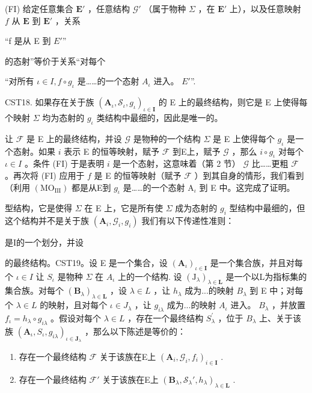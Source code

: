 (FI) 给定任意集合 \(\mathbf{E}'\) ，任意结构 \(\mathcal{G}'\) （属于物种 \(\Sigma\) ，在 \(\mathbf{E}'\) 上），以及任意映射 \(f\) 从 \(\mathbf{E}\) 到 \(\mathbf{E}'\) ，关系

“f 是从 E 到 \(E'\)''

的态射”等价于关系“对每个

``对所有 \(\iota\in I,f\circ g_{\iota}\) 是……的一个态射 \(A_{\iota}\) 进入。 \(E'\)''.

CST18. 如果存在关于族 \((\mathbf{A}_{\iota}, \mathcal{S}_{\iota}, g_{\iota})_{\iota \in \mathbf{I}}\) 的 E 上的最终结构，则它是 E 上使得每个映射 \(\Sigma\) 均为态射的 \(g_{\iota}\) 类结构中最细的，因此是唯一的。

让 \(\mathcal{F}\) 是 E 上的最终结构，并设 \(\mathcal{G}\) 是物种的一个结构 \(\Sigma\) 是 E 上使得每个 \(g_{\iota}\) 是一个态射。如果 \(i\) 表示 E 的恒等映射，赋予 \(\mathcal{F}\) 到E上，赋予 \(\mathcal{G}\) ，那么 \(i \circ g_{\iota}\) 对每个 \(\iota \in I\) 。条件 (FI) 于是表明 \(i\) 是一个态射，这意味着（第 2 节） \(\mathcal{G}\) 比……更粗 \(\mathcal{F}\) 。再次将 (FI) 应用于 \(f\) 是 E 的恒等映射（赋予 \(\mathcal{F}\) ）到其自身的情形，我们看到（利用 \((\mathrm{MO}_{\mathrm{III}})\) 都是从E到 \(g_{\iota}\) 是……的一个态射 \(\mathrm{A}_{\iota}\) 到 E 中。这完成了证明。

型结构，它是使得 \(\Sigma\) 在 E 上，它是所有使 \(\Sigma\) 成为态射的 \(g_{i}\) 型结构中最细的，但这个结构并不是关于族 \((\mathbf{A}_{i},\mathcal{G}_{i},g_{i})\) 我们有以下传递性准则：

是I的一个划分，并设

的最终结构。CST19。设 E 是一个集合，设 \((\mathbf{A}_{\iota})_{\iota\in\mathbf{I}}\) 是一个集合族，并且对每个 \(\iota\in I\) 让 \(S_{\iota}\) 是物种 \(\Sigma\) 在 \(A_{\iota}\) 上的一个结构. 设 \((\mathrm{J}_{\lambda})_{\lambda\in\mathbf{L}}\) 是一个以L为指标集的集合族。对每个 \((\mathbf{B}_{\lambda})_{\lambda\in\mathbf{L}}\) ，设 \(\lambda\in L\) ，让 \(h_{\lambda}\) 成为...的映射 \(B_{\lambda}\) 到 E 中；对每个 \(\lambda\in L\) 的映射，且对每个 \(\iota\in J_{\lambda}\) ，让 \(g_{i\lambda}\) 成为...的映射 \(A_{\iota}\) 进入。 \(B_{\lambda}\) ，并放置 \(f_{\iota}=h_{\lambda}\circ g_{i\lambda}\) 。假设对每个 \(\lambda\in L\) ，存在一个最终结构 \(S_{\lambda}^{\prime}\) ，位于 \(B_{\lambda}\) 上、关于该族 \((\mathbf{A}_{\iota},S_{\iota},g_{i\lambda})_{\iota\in\mathbf{J}_{\lambda}}\) ，那么以下陈述是等价的：

\begin{enumerate}
\def\labelenumi{(\alph{enumi})}
\item
  存在一个最终结构 \(\mathcal{F}\) 关于该族在E上 \((\mathbf{A}_i, \mathcal{G}_i, f_i)_{i \in \mathbf{I}}\) .
\item
  存在一个最终结构 \(\mathcal{F}'\) 关于该族在E上 \((\mathbf{B}_{\lambda}, \mathcal{S}_{\lambda}', h_{\lambda})_{\lambda \in \mathbf{L}}\) .
\end{enumerate}

